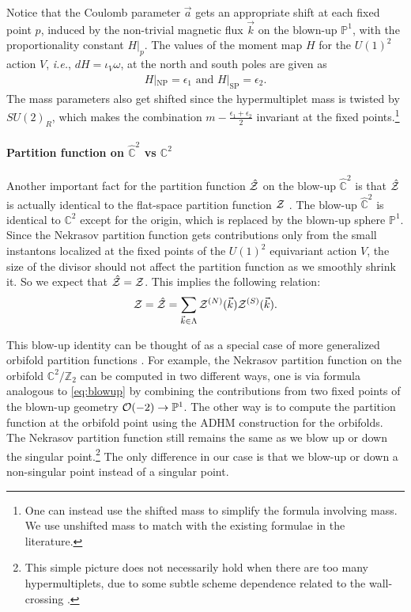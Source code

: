 \documentclass[letterpaper, 11pt]{article}
\def\IC{\mathbb{C}}
\def\IP{\mathbb{P}}
\def\IZ{\mathbb{Z}}
\def\CO{{\cal O}}
\def\CZ{{\cal Z}}
\def\e{\epsilon}
\begin{document}
Notice that the Coulomb parameter $\vec{a}$ gets an appropriate shift at each fixed point $p$, induced by the non-trivial magnetic flux $\vec{k}$ on the blown-up $\IP^1$, with the proportionality constant $H|_p$. The values of the moment map $H$ for the $U(1)^2$ action $V$,  \textit{i.e.}, $dH = \iota_V \omega$, at the north and south poles are given as
\begin{align}
  H|_\text{NP} = \epsilon_1 \text{ and } H|_\text{SP} = \epsilon_2.
\end{align}
The mass parameters also get shifted since the hypermultiplet mass is twisted by $SU(2)_R$, which makes the combination $m - \frac{\e_1+\e_2}{2}$ invariant at the fixed points.\footnote{One can instead use the shifted mass to simplify the formula involving mass. We use unshifted mass to match with the existing formulae in the literature.} 

\paragraph{Partition function on $\hat{\IC}^2$ vs $\IC^2$}
Another important fact for the partition function $\hat{\CZ}$ on the blow-up $\hat{\IC}^2$ is that $\hat{\CZ}$ is actually identical to the flat-space partition function $\CZ$  \cite{Nakajima:2003pg,Nakajima:2003uh,Nakajima:2005fg, Gottsche:2006bm, Nakajima:2009qjc, Gottsche:2010ig}.
The blow-up $\hat{\IC}^2$ is identical to $\IC^2$ except for the origin, which is replaced by the blown-up sphere $\IP^1$. 
Since the Nekrasov partition function gets contributions only from the small instantons localized at the fixed points of the $U(1)^2$ equivariant action $V$, the size of the divisor should not affect the partition function as we smoothly shrink it. So we expect that $\hat{\CZ} = \CZ$. This implies the following relation: 
\begin{align} 
  \label{eq:blowup-generic}
  \CZ = \hat{\CZ} = \sum_{\vec{k} \in \Lambda} \CZ^{(N)}(\vec{k}) \CZ^{(S)}(\vec{k}).
\end{align}

This blow-up identity can be thought of as a special case of more generalized orbifold partition functions \cite{Sasaki:2006vq,Bonelli:2012ny,Ito:2013kpa, Bruzzo:2013daa, Bruzzo:2014jza}. 
For example, the Nekrasov partition function on the orbifold $\IC^2/\IZ_2$ can be computed in two different ways, one is via formula analogous to \eqref{eq:blowup} by combining the contributions from two fixed points of the blown-up geometry $\CO(-2) \to \IP^1$. The other way is to compute the partition function at the orbifold point using the ADHM construction for the orbifolds. The Nekrasov partition function still remains the same as we blow up or down the singular point.\footnote{This simple picture does not necessarily hold when there are too many hypermultiplets, due to some subtle scheme dependence related to the wall-crossing \cite{Ito:2013kpa}.} 
The only difference in our case is that we blow-up or down a non-singular point instead of a singular point. 
\end{document}
